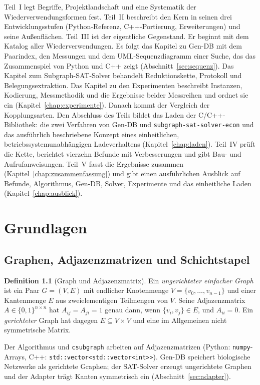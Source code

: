 \documentclass[a4paper,12pt,twoside]{report}
\DeclareRobustCommand{\_}{\textunderscore\allowbreak{}}
\theoremstyle{definition}
\newtheorem{definition}{Definition}[chapter]
\begin{document}
Teil~I legt Begriffe, Projektlandschaft und eine Systematik der Wiederverwendungsformen fest. Teil~II beschreibt den Kern in seinen drei Entwicklungsstufen (Python-Referenz, C++-Portierung, Erweiterungen) und seine Außenflächen. Teil~III ist der eigentliche Gegenstand. Er beginnt mit dem Katalog aller Wiederverwendungen. Es folgt das Kapitel zu Gen-DB mit dem Paarindex, den Messungen und dem UML-Sequenzdiagramm einer Suche, das das Zusammenspiel von Python und C++ zeigt (Abschnitt~\ref{sec:sequenz}). Das Kapitel zum Subgraph-SAT-Solver behandelt Reduktionskette, Protokoll und Belegungsextraktion. Das Kapitel zu den Experimenten beschreibt Instanzen, Kodierung, Messmethodik und die Ergebnisse beider Messreihen und ordnet sie ein (Kapitel~\ref{chap:experimente}). Danach kommt der Vergleich der Kopplungsarten. Den Abschluss des Teils bildet das Laden der C/C++-Bibliothek: die zwei Verfahren von Gen-DB und \texttt{subgraph-sat-solver-econ} und das ausführlich beschriebene Konzept eines einheitlichen, betriebssystemunabhängigen Ladeverhaltens (Kapitel~\ref{chap:laden}). Teil~IV prüft die Kette, berichtet vierzehn Befunde mit Verbesserungen und gibt Bau- und Aufrufanweisungen. Teil~V fasst die Ergebnisse zusammen (Kapitel~\ref{chap:zusammenfassung}) und gibt einen ausführlichen Ausblick auf Befunde, Algorithmus, Gen-DB, Solver, Experimente und das einheitliche Laden (Kapitel~\ref{chap:ausblick}).

\chapter{Grundlagen}
\label{chap:grundlagen}
 
\section{Graphen, Adjazenzmatrizen und Schichtstapel}
 
\begin{definition}[Graph und Adjazenzmatrix]
	Ein \emph{ungerichteter einfacher Graph} ist ein Paar $G=(V,E)$ mit endlicher Knotenmenge $V=\{v_0,\ldots,v_{n-1}\}$ und einer Kantenmenge $E$ aus zweielementigen Teilmengen von $V$. Seine Adjazenzmatrix $A\in\{0,1\}^{n\times n}$ hat $A_{ij}=A_{ji}=1$ genau dann, wenn $\{v_i,v_j\}\in E$, und $A_{ii}=0$. Ein \emph{gerichteter} Graph hat dagegen $E\subseteq V\times V$ und eine im Allgemeinen nicht symmetrische Matrix.
\end{definition}
 
Der Algorithmus und \texttt{csubgraph} arbeiten auf Adjazenzmatrizen (Python: \texttt{numpy}-Arrays, C++: \texttt{std::vector<std::vector<int>>}). Gen-DB speichert biologische Netzwerke als gerichtete Graphen; der SAT-Solver erzeugt ungerichtete Graphen und der Adapter trägt Kanten symmetrisch ein (Abschnitt~\ref{sec:adapter}).
 
\end{document}
